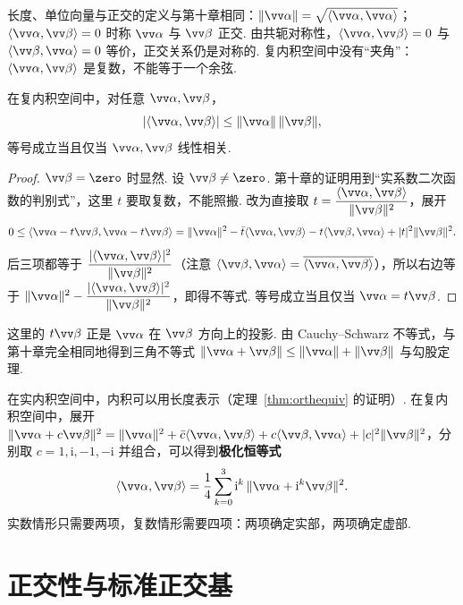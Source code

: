 	长度、单位向量与正交的定义与第十章相同：$\|\vv\alpha\|=\sqrt{\langle\vv\alpha,\vv\alpha\rangle}$；$\langle\vv\alpha,\vv\beta\rangle=0$ 时称 $\vv\alpha$ 与 $\vv\beta$ 正交. 由共轭对称性，$\langle\vv\alpha,\vv\beta\rangle=0$ 与 $\langle\vv\beta,\vv\alpha\rangle=0$ 等价，正交关系仍是对称的. 复内积空间中没有“夹角”：$\langle\vv\alpha,\vv\beta\rangle$ 是复数，不能等于一个余弦.
	
	\begin{theorem}\label{thm:cscomplex}
		在复内积空间中，对任意 $\vv\alpha,\vv\beta$，
		\[|\langle\vv\alpha,\vv\beta\rangle|\le\|\vv\alpha\|\,\|\vv\beta\|,\]
		等号成立当且仅当 $\vv\alpha,\vv\beta$ 线性相关.
	\end{theorem}
	\begin{proof}
		$\vv\beta=\zero$ 时显然. 设 $\vv\beta\ne\zero$. 第十章的证明用到“实系数二次函数的判别式”，这里 $t$ 要取复数，不能照搬. 改为直接取 $t=\dfrac{\langle\vv\alpha,\vv\beta\rangle}{\|\vv\beta\|^2}$，展开
		\[0\le\langle\vv\alpha-t\vv\beta,\vv\alpha-t\vv\beta\rangle=\|\vv\alpha\|^2-\bar t\langle\vv\alpha,\vv\beta\rangle-t\langle\vv\beta,\vv\alpha\rangle+|t|^2\|\vv\beta\|^2.\]
		后三项都等于 $\dfrac{|\langle\vv\alpha,\vv\beta\rangle|^2}{\|\vv\beta\|^2}$（注意 $\langle\vv\beta,\vv\alpha\rangle=\overline{\langle\vv\alpha,\vv\beta\rangle}$），所以右边等于 $\|\vv\alpha\|^2-\dfrac{|\langle\vv\alpha,\vv\beta\rangle|^2}{\|\vv\beta\|^2}$，即得不等式. 等号成立当且仅当 $\vv\alpha=t\vv\beta$.
	\end{proof}
	
	这里的 $t\vv\beta$ 正是 $\vv\alpha$ 在 $\vv\beta$ 方向上的投影. 由 Cauchy–Schwarz 不等式，与第十章完全相同地得到三角不等式 $\|\vv\alpha+\vv\beta\|\le\|\vv\alpha\|+\|\vv\beta\|$ 与勾股定理.
	
	在实内积空间中，内积可以用长度表示（定理~\ref{thm:orthequiv} 的证明）. 在复内积空间中，展开 $\|\vv\alpha+c\vv\beta\|^2=\|\vv\alpha\|^2+\bar c\langle\vv\alpha,\vv\beta\rangle+c\langle\vv\beta,\vv\alpha\rangle+|c|^2\|\vv\beta\|^2$，分别取 $c=1,\mathrm i,-1,-\mathrm i$ 并组合，可以得到\textbf{极化恒等式}
	\begin{equation}\label{eq:polarization}
		\langle\vv\alpha,\vv\beta\rangle=\frac14\sum_{k=0}^{3}\mathrm i^k\,\|\vv\alpha+\mathrm i^k\vv\beta\|^2.
	\end{equation}
	实数情形只需要两项，复数情形需要四项：两项确定实部，两项确定虚部.
	
	\section{\hC 正交性与标准正交基}\label{sec:unitaryonb}
	
